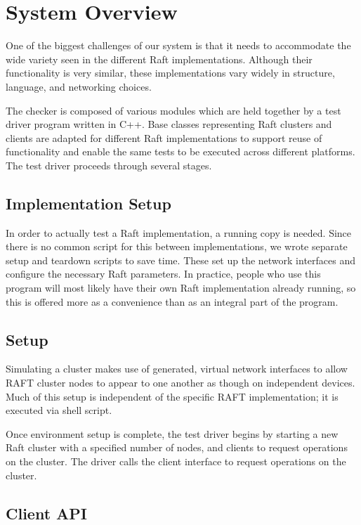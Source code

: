 \documentclass[UTF8]{article}
\begin{document}
\section{System Overview}
One of the biggest challenges of our system is that it needs to accommodate the wide variety seen in the different Raft implementations. Although their functionality is very similar, these implementations vary widely in structure, language, and networking choices.

The checker is composed of various modules which are held together by a test driver program written in C++. Base classes representing Raft clusters and clients are adapted for different Raft implementations to support reuse of functionality and enable the same tests to be executed across different platforms. The test driver proceeds through several stages.

\subsection{Implementation Setup}
In order to actually test a Raft implementation, a running copy is needed. Since there is no common script for this between implementations, we wrote separate setup and teardown scripts to save time. These set up the network interfaces and configure the necessary Raft parameters. In practice, people who use this program will most likely have their own Raft implementation already running, so this is offered more as a convenience than as an integral part of the program.

\subsection{Setup}

Simulating a cluster makes use of generated, virtual network interfaces to allow RAFT cluster nodes to appear to one another as though on independent devices. Much of this setup is independent of the specific RAFT implementation; it is executed via shell script.

Once environment setup is complete, the test driver begins by starting a new Raft cluster with a specified number of nodes, and clients to request operations on the cluster. The driver calls the client interface to request operations on the cluster.

\subsection{Client API}
\end{document}

